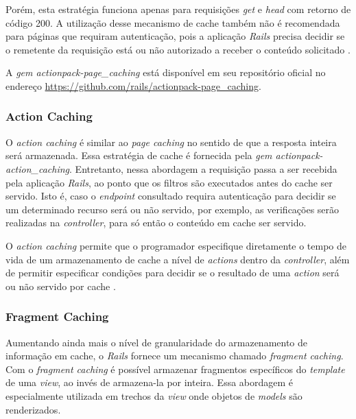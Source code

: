 Porém, esta estratégia funciona apenas para requisições \textit{get} e \textit{head} com retorno de código 200. A utilização desse mecanismo de cache também não é recomendada para páginas que requiram autenticação, pois a aplicação \textit{Rails} precisa decidir se o remetente da requisição está ou não autorizado a receber o conteúdo solicitado \cite{actionpack-page-caching}.

A \textit{gem actionpack-page\_caching} está disponível em seu repositório oficial no endereço \href{https://github.com/rails/actionpack-page_caching}{https://github.com/rails/actionpack-page\_caching}.

\subsubsection{Action Caching}

O \textit{action caching} é similar ao \textit{page caching} no sentido de que a resposta inteira será armazenada. Essa estratégia de cache é fornecida pela \textit{gem actionpack-action\_caching}. Entretanto, nessa abordagem a requisição passa a ser recebida pela aplicação \textit{Rails}, ao ponto que os filtros são executados antes do cache ser servido. Isto é, caso o \textit{endpoint} consultado requira autenticação para decidir se um determinado recurso será ou não servido, por exemplo, as verificações serão realizadas na \textit{controller}, para só então o conteúdo em cache ser servido.

O \textit{action caching} permite que o programador especifique diretamente o tempo de vida de um armazenamento de cache a nível de \textit{actions} dentro da \textit{controller}, além de permitir especificar condições para decidir se o resultado de uma \textit{action} será ou não servido por cache \cite{actionpack-action-caching}.

\subsubsection{Fragment Caching}

Aumentando ainda mais o nível de granularidade do armazenamento de informação em cache, o \textit{Rails} fornece um mecanismo chamado \textit{fragment caching}. Com o \textit{fragment caching} é possível armazenar fragmentos específicos do \textit{template} de uma \textit{view}, ao invés de armazena-la por inteira. Essa abordagem é especialmente utilizada em trechos da \textit{view} onde objetos de \textit{models} são renderizados.

